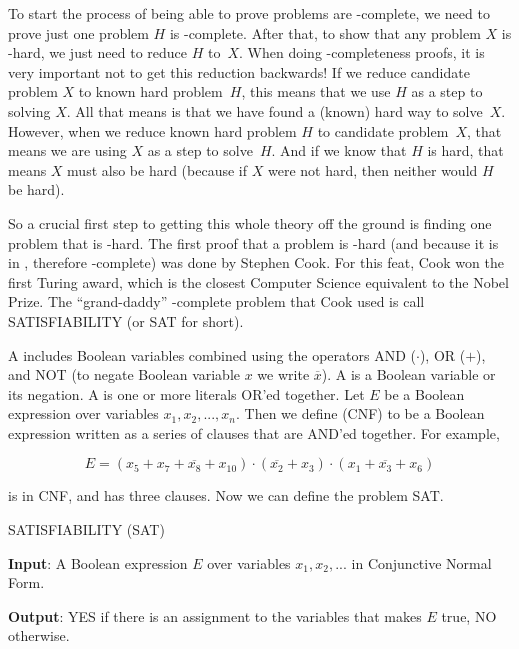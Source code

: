 To start the process of being able to prove problems are \NP-complete,
we need to prove just one problem \(H\) is \NP-complete.
After that, to show that any problem \(X\) is \NP-hard, we just
need to reduce \(H\) to~\(X\).
When doing \NP-completeness proofs, it is very important not to get
this reduction backwards!
If we reduce candidate problem \(X\) to known hard problem~\(H\), this
means that we use \(H\) as a step to solving \(X\).
All that means is that we have found a (known) hard way to
solve~\(X\).
However, when we reduce known hard problem \(H\) to candidate
problem~\(X\), that means we are using \(X\) as a step to
solve~\(H\).
And if we know that \(H\) is hard, that means \(X\) must also be hard
(because if \(X\) were not hard, then neither would \(H\) be hard).

So a crucial first step to getting this whole theory off the ground is
finding one problem that is \NP-hard.
The first proof that a problem is \NP-hard (and because it is in \NP,
therefore \NP-complete) was done by Stephen Cook.
For this feat, Cook won the first Turing award, which is the closest
Computer Science equivalent to the Nobel Prize.
The ``grand-daddy'' \NP-complete problem that Cook used is call
SATISFIABILITY (or SAT for short).

A  includes Boolean variables combined using
the operators AND (\(\cdot\)), OR (\(+\)), and NOT (to negate Boolean
variable \(x\) we write \(\overline{x}\)).
A  is a Boolean variable or its negation.
A  is one or more literals OR'ed together.
Let \(E\) be a Boolean expression over variables \(x_1, x_2, ..., x_n\).
Then we define  (CNF) to be a Boolean
expression written as a series of clauses that are AND'ed together.
For example,

\[E = (x_5 + x_7 + \overline{x_8} + x_{10}) \cdot (\overline{x_2} + x_3)
\cdot (x_1 + \overline{x_3} + x_6)\]

\noindent is in CNF, and has three clauses.
Now we can define the problem SAT.

\begin{inbox}
SATISFIABILITY (SAT)

{\bf Input}: A Boolean expression \(E\) over variables \(x_1, x_2,
...\) in Conjunctive Normal Form.

{\bf Output}: YES if there is an assignment to the variables that
makes \(E\) true, NO otherwise.
\end{inbox}

